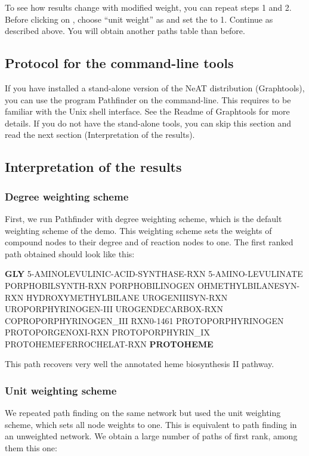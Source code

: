 To see how results change with modified weight, you can repeat steps 1 and 2. Before clicking on , choose ``unit weight'' as  and set the  to 1. Continue as described above. You will obtain another paths table than before.

\subsection{Protocol for the command-line tools}

If you have installed a stand-alone version of the NeAT distribution (Graphtools), you can use the 
program Pathfinder on the command-line. This requires to be familiar with the 
Unix shell interface. See the Readme of Graphtools for more details.
If you do not have the stand-alone tools, you can skip this section 
and read the next section (Interpretation of the results). 

\subsection{Interpretation of the results}

\subsubsection{Degree weighting scheme}

First, we run Pathfinder with degree weighting scheme, which is the default weighting scheme of the demo. This weighting scheme sets the weights of compound nodes to their degree and of reaction nodes to one. The first ranked path obtained should look like this:

\textbf{GLY} 5-AMINOLEVULINIC-ACID-SYNTHASE-RXN  5-AMINO-LEVULINATE  PORPHOBILSYNTH-RXN PORPHOBILINOGEN OHMETHYLBILANESYN-RXN HYDROXYMETHYLBILANE UROGENIIISYN-RXN UROPORPHYRINOGEN-III UROGENDECARBOX-RXN COPROPORPHYRINOGEN\_III RXN0-1461 PROTOPORPHYRINOGEN PROTOPORGENOXI-RXN PROTOPORPHYRIN\_IX PROTOHEMEFERROCHELAT-RXN \textbf{PROTOHEME} 	

This path recovers very well the annotated heme biosynthesis II pathway. 

\subsubsection{Unit weighting scheme}
We repeated path finding on the same network but used the unit weighting scheme, which sets all node weights to one. This is equivalent to path finding in an unweighted network. We obtain a large number of paths of first rank, among them this one:

